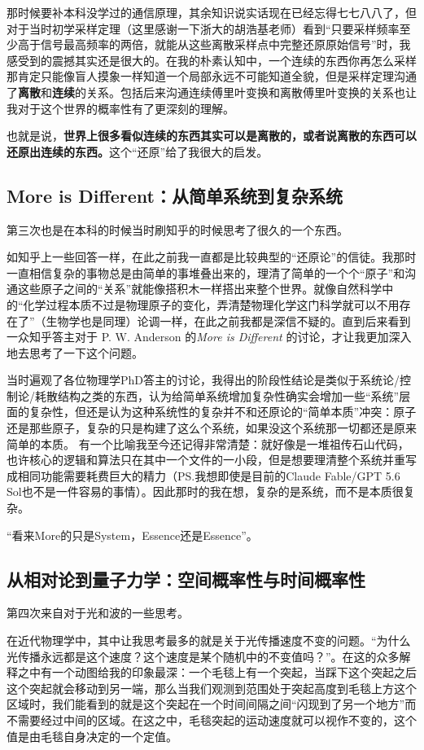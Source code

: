 \documentclass[11pt,twoside,fontset=none,scheme=plain]{ctexart}
\begin{document}
    那时候要补本科没学过的通信原理，其余知识说实话现在已经忘得七七八八了，但对于当时初学采样定理（这里感谢一下浙大的胡浩基老师）看到“只要采样频率至少高于信号最高频率的两倍，就能从这些离散采样点中完整还原原始信号”时，我感受到的震撼其实还是很大的。在我的朴素认知中，一个连续的东西你再怎么采样那肯定只能像盲人摸象一样知道一个局部永远不可能知道全貌，但是采样定理沟通了\textbf{离散}和\textbf{连续}的关系。包括后来沟通连续傅里叶变换和离散傅里叶变换的关系也让我对于这个世界的概率性有了更深刻的理解。

    也就是说，\textbf{世界上很多看似连续的东西其实可以是离散的，或者说离散的东西可以还原出连续的东西。}这个“还原”给了我很大的启发。

    \subsection{More is Different：从简单系统到复杂系统}
    第三次也是在本科的时候当时刷知乎的时候思考了很久的一个东西。

    如知乎上一些回答一样，在此之前我一直都是比较典型的“还原论”的信徒。我那时一直相信复杂的事物总是由简单的事堆叠出来的，理清了简单的一个个“原子”和沟通这些原子之间的“关系”就能像搭积木一样搭出来整个世界。就像自然科学中的“化学过程本质不过是物理原子的变化，弄清楚物理化学这门科学就可以不用存在了”（生物学也是同理）论调一样，在此之前我都是深信不疑的。直到后来看到一众知乎答主对于 P. W. Anderson 的\textit{More is Different}\citep{anderson1972more} 的讨论，才让我更加深入地去思考了一下这个问题。

    当时遍观了各位物理学PhD答主的讨论，我得出的阶段性结论是类似于系统论/控制论/耗散结构之类的东西，认为给简单系统增加复杂性确实会增加一些“系统”层面的复杂性，但还是认为这种系统性的复杂并不和还原论的“简单本质”冲突：原子还是那些原子，复杂的只是构建了这么个系统，如果没这个系统那一切都还是原来简单的本质。 有一个比喻我至今还记得非常清楚：就好像是一堆祖传石山代码，也许核心的逻辑和算法只在其中一个文件的一小段，但是想要理清整个系统并重写成相同功能需要耗费巨大的精力（PS.我想即使是目前的Claude Fable/GPT 5.6 Sol也不是一件容易的事情）。因此那时的我在想，复杂的是系统，而不是本质很复杂。

    “看来More的只是System，Essence还是Essence”。

    \subsection{从相对论到量子力学：空间概率性与时间概率性}
    第四次来自对于光和波的一些思考。

    在近代物理学中，其中让我思考最多的就是关于光传播速度不变的问题。“为什么光传播永远都是这个速度？这个速度是某个随机中的不变值吗？”。在这的众多解释之中有一个动图给我的印象最深：一个毛毯上有一个突起，当踩下这个突起之后这个突起就会移动到另一端，那么当我们观测到范围处于突起高度到毛毯上方这个区域时，我们能看到的就是这个突起在一个时间间隔之间“闪现到了另一个地方”而不需要经过中间的区域。在这之中，毛毯突起的运动速度就可以视作不变的，这个值是由毛毯自身决定的一个定值。
\end{document}
